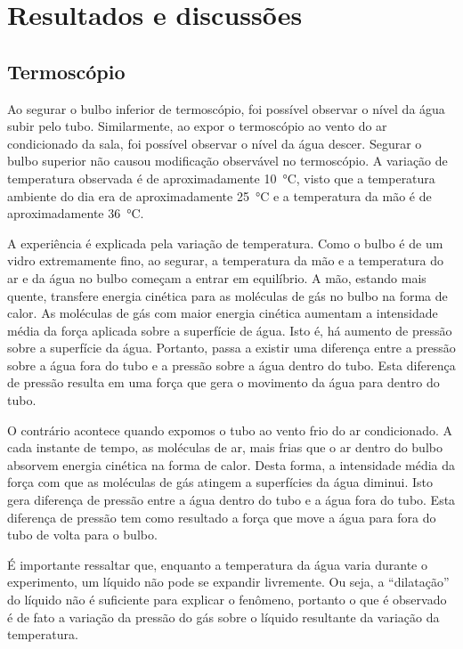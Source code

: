 \section{Resultados e discussões}
\subsection{Termoscópio}

Ao segurar o bulbo inferior de termoscópio, foi possível observar o nível da água subir pelo tubo. Similarmente, ao expor o termoscópio ao vento do ar condicionado da sala, foi possível observar o nível da água descer. Segurar o bulbo superior não causou modificação observável no termoscópio. A variação de temperatura observada é de aproximadamente \qty{10}{\celsius}, visto que a temperatura ambiente do dia era de aproximadamente \qty{25}{\celsius} e a temperatura da mão é de aproximadamente \qty{36}{\celsius}.  

A experiência é explicada pela variação de temperatura. Como o bulbo é de um vidro extremamente fino, ao segurar, a temperatura da mão e a temperatura do ar e da água no bulbo começam a entrar em equilíbrio. A mão, estando mais quente, transfere energia cinética para as moléculas de gás no bulbo na forma de calor. As moléculas de gás com maior energia cinética aumentam a intensidade média da força aplicada sobre a superfície de água. Isto é, há aumento de pressão sobre a superfície da água. Portanto, passa a existir uma diferença entre a pressão sobre a água fora do tubo e a pressão sobre a água dentro do tubo. Esta diferença de pressão resulta em uma força que gera o movimento da água para dentro do tubo. 

O contrário acontece quando expomos o tubo ao vento frio do ar condicionado. A cada instante de tempo, as moléculas de ar, mais frias que o ar dentro do bulbo absorvem energia cinética na forma de calor. Desta forma, a intensidade média da força com que as moléculas de gás atingem a superfícies da água diminui. Isto gera diferença de pressão entre a água dentro do tubo e a água fora do tubo. Esta diferença de pressão  tem como resultado a força que move a água para fora do tubo de volta para o bulbo.

É importante ressaltar que, enquanto a temperatura da água varia durante o experimento, um líquido não pode se expandir livremente. Ou seja, a ``dilatação'' do líquido não é suficiente para explicar o fenômeno, portanto o que é observado é de fato a variação da pressão do gás sobre o líquido resultante da variação da temperatura. 

